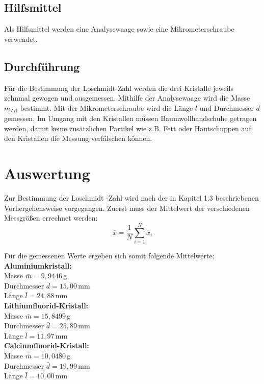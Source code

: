 \documentclass[12pt,a4paper,titlepage,headinclude,bibtotoc]{scrartcl}
\begin{document}
\subsection{Hilfsmittel}
Als Hilfsmittel werden eine Analysewaage sowie eine Mikrometerschraube verwendet.

\subsection{Durchführung}

Für die Bestimmung der Loschmidt-Zahl werden die drei Kristalle jeweils zehnmal gewogen und ausgemessen. Mithilfe der Analysewaage wird die Masse $m_\mathrm{Zyl}$ bestimmt. Mit der Mikrometerschraube wird die Länge $l$ und Durchmesser $d$ gemessen. Im Umgang mit den Kristallen müssen Baumwollhandschuhe getragen werden, damit keine zusätzlichen Partikel wie z.B. Fett oder Hautschuppen auf den Kristallen die Messung verfälschen können. 

\newpage
\section{Auswertung}
Zur Bestimmung der Loschmidt -Zahl wird nach der in Kapitel 1.3 beschriebenen Vorhergehensweise vorgegangen. Zuerst muss der Mittelwert der verschiedenen Messgrößen errechnet werden:
\begin{equation}
\bar{x}=\frac{1}{N} \sum_{i=1}^N x_i
\end{equation}

Für die gemessenen Werte ergeben sich somit folgende Mittelwerte:\\

\vspace{3mm}
\textbf{Aluminiumkristall:}\\
Masse $\bar{m}=9,9446$\,g \\
Durchmesser $\bar{d}=15,00$\,mm \\
Länge $\bar{l}=24,88$\,mm\\

\vspace{3mm}
\textbf{Lithiumfluorid-Kristall:}\\
Masse $\bar{m}=15,8499$\,g \\
Durchmesser $\bar{d}=25,89$\,mm \\
Länge $\bar{l}=11,97$\,mm\\

\vspace{3mm}
\textbf{Calciumfluorid-Kristall:}\\
Masse $\bar{m}=10,0480$\,g \\
Durchmesser $\bar{d}=19,99$\,mm \\
Länge $\bar{l}=10,00$\,mm\\
\end{document}
